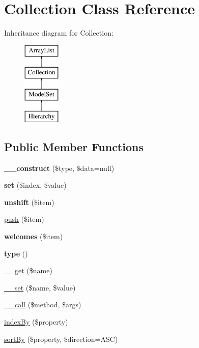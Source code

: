 \hypertarget{classCollection}{
\section{Collection Class Reference}
\label{classCollection}
}
Inheritance diagram for Collection:\begin{figure}[H]
\begin{center}
\leavevmode
\includegraphics[height=4.000000cm]{classCollection}
\end{center}
\end{figure}
\subsection*{Public Member Functions}
\begin{DoxyCompactItemize}
\item 
\hypertarget{classCollection_a24944b0b4138f2d5ec0a1cbb9bc85ade}{
{\bfseries \_\-\_\-construct} (\$type, \$data=null)}
\label{classCollection_a24944b0b4138f2d5ec0a1cbb9bc85ade}

\item 
\hypertarget{classCollection_a1d8e8a80564ac93eb8d636e7877447ec}{
{\bfseries set} (\$index, \$value)}
\label{classCollection_a1d8e8a80564ac93eb8d636e7877447ec}

\item 
\hypertarget{classCollection_aebaa5b4f4f01e5bb8cd80a6b8d68358b}{
{\bfseries unshift} (\$item)}
\label{classCollection_aebaa5b4f4f01e5bb8cd80a6b8d68358b}

\item 
\hyperlink{classCollection_afa19de785c3fb54f187786782d082733}{push} (\$item)
\item 
\hypertarget{classCollection_ab889e651767d1598189ab61b4a3c75f8}{
{\bfseries welcomes} (\$item)}
\label{classCollection_ab889e651767d1598189ab61b4a3c75f8}

\item 
\hypertarget{classCollection_a3db7e9a0b39b65f39677b549364547f3}{
{\bfseries type} ()}
\label{classCollection_a3db7e9a0b39b65f39677b549364547f3}

\item 
\hyperlink{classCollection_a20622fcde06bbba3f05487f26773eef6}{\_\-\_\-get} (\$name)
\item 
\hyperlink{classCollection_a9e79c3f33f3780c717b06ba727484dcc}{\_\-\_\-set} (\$name, \$value)
\item 
\hyperlink{classCollection_aa4a0ddb57505aa399a273b061e997108}{\_\-\_\-call} (\$method, \$args)
\item 
\hyperlink{classCollection_a2ed1317fa00c1096a60a6877e1fa245f}{indexBy} (\$property)
\item 
\hyperlink{classCollection_a8d86dc7d75820b2646ee91f79317feec}{sortBy} (\$property, \$direction=ASC)
\end{DoxyCompactItemize}
